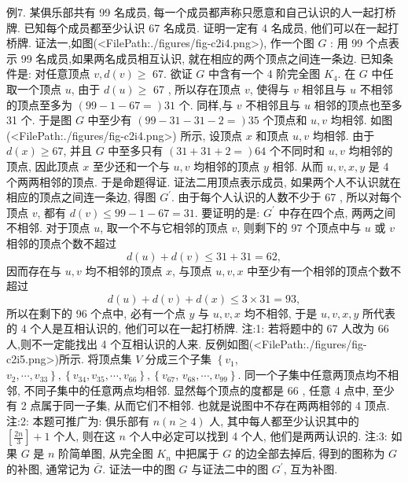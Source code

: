 例7. 某俱乐部共有 99 名成员, 每一个成员都声称只愿意和自己认识的人一起打桥牌.
已知每个成员都至少认识 67 名成员.
证明一定有 4 名成员, 他们可以在一起打桥牌.
证法一,如图(<FilePath:./figures/fig-c2i4.png>), 作一个图 $G$ : 用 99 个点表示 99 名成员,如果两名成员相互认识, 就在相应的两个顶点之间连一条边.
已知条件是: 对任意顶点 $v, d(v) \geqslant$ 67. 欲证 $G$ 中含有一个 4 阶完全图 $K_4$.
在 $G$ 中任取一个顶点 $u$, 由于 $d(u) \geqslant$ 67 , 所以存在顶点 $v$, 使得与 $v$ 相邻且与 $u$ 不相邻的顶点至多为 $(99-1-67=) 31$ 个.
同样,与 $v$ 不相邻且与 $u$ 相邻的顶点也至多 31 个.
于是图 $G$ 中至少有 $(99-31- 31-2=) 35$ 个顶点和 $u, v$ 均相邻.
如图(<FilePath:./figures/fig-c2i4.png>) 所示, 设顶点 $x$ 和顶点 $u, v$ 均相邻.
由于 $d(x) \geqslant 67$, 并且 $G$ 中至多只有 $(31+31+2=) 64$ 个不同时和 $u, v$ 均相邻的顶点, 因此顶点 $x$ 至少还和一个与 $u, v$ 均相邻的顶点 $y$ 相邻.
从而 $u, v, x, y$ 是 4 个两两相邻的顶点.
于是命题得证.
证法二用顶点表示成员, 如果两个人不认识就在相应的顶点之间连一条边, 得图 $G^{\prime}$. 由于每个人认识的人数不少于 67 , 所以对每个顶点 $v$, 都有 $d(v) \leqslant 99-1-67=31$. 要证明的是: $G^{\prime}$ 中存在四个点, 两两之间不相邻.
对于顶点 $u$, 取一个不与它相邻的顶点 $v$, 则剩下的 97 个顶点中与 $u$ 或 $v$ 相邻的顶点个数不超过
$$
d(u)+d(v) \leqslant 31+31=62,
$$
因而存在与 $u, v$ 均不相邻的顶点 $x$, 与顶点 $u, v, x$ 中至少有一个相邻的顶点个数不超过
$$
d(u)+d(v)+d(x) \leqslant 3 \times 31=93,
$$
所以在剩下的 96 个点中, 必有一个点 $y$ 与 $u, v, x$ 均不相邻, 于是 $u, v, x, y$ 所代表的 4 个人是互相认识的, 他们可以在一起打桥牌.
注:1: 若将题中的 67 人改为 66 人,则不一定能找出 4 个互相认识的人来.
反例如图(<FilePath:./figures/fig-c2i5.png>)所示.
将顶点集 $V$ 分成三个子集 $\left\{v_1\right.$, $\left.v_2, \cdots, v_{33}\right\},\left\{v_{34}, v_{35}, \cdots, v_{66}\right\},\left\{v_{67}\right.$, $\left.v_{68}, \cdots, v_{99}\right\}$. 同一个子集中任意两顶点均不相邻, 不同子集中的任意两点均相邻.
显然每个顶点的度都是 66 , 任意 4 点中, 至少有 2 点属于同一子集, 从而它们不相邻.
也就是说图中不存在两两相邻的 4 顶点.
注:2: 本题可推广为:
俱乐部有 $n(n \geqslant 4)$ 人, 其中每人都至少认识其中的 $\left[\frac{2 n}{3}\right]+1$ 个人, 则在这 $n$ 个人中必定可以找到 4 个人, 他们是两两认识的.
注:3: 如果 $G$ 是 $n$ 阶简单图, 从完全图 $K_n$ 中把属于 $G$ 的边全部去掉后, 得到的图称为 $G$ 的补图, 通常记为 $\bar{G}$. 证法一中的图 $G$ 与证法二中的图 $G^{\prime}$, 互为补图.




